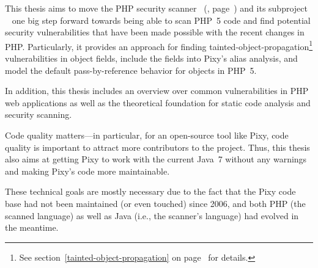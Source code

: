This thesis aims to move the PHP security scanner ~(\cite{pixy}, page~\pageref{pixy}) and its subproject ~\cite{phpparser} one big step forward towards being able to scan PHP~5 code and find potential security vulnerabilities that have been made possible with the recent changes in PHP. Particularly, it provides an approach for finding tainted-object-propagation\footnote{See section~\ref{tainted-object-propagation} on page~\pageref{tainted-object-propagation} for details.} vulnerabilities in object fields, include the fields into Pixy's alias analysis, and model the default pass-by-reference behavior for objects in PHP~5.

In addition, this thesis includes an overview over common vulnerabilities in PHP web applications as well as the theoretical foundation for static code analysis and security scanning.

Code quality matters---in particular, for an open-source tool like Pixy, code quality is important to attract more contributors to the project. Thus, this thesis also aims at getting Pixy to work with the current Java~7 without any warnings and making Pixy's code more maintainable.

These technical goals are mostly necessary due to the fact that the Pixy code base had not been maintained (or even touched) since 2006, and both PHP (\ie the scanned language) as well as Java (i.e., the scanner's language) had evolved in the meantime.
